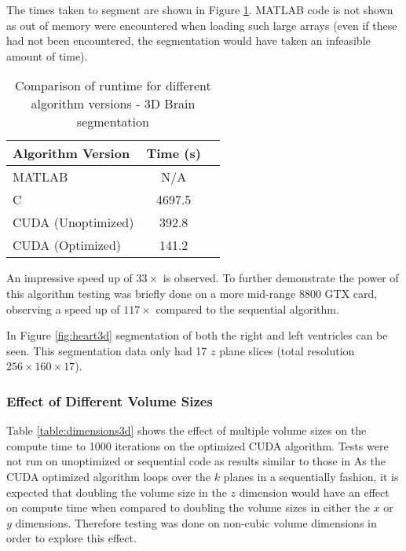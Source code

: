 The times taken to segment are shown in Figure \ref{brain3dtime}. MATLAB code is not shown as out of memory were encountered when loading such large arrays (even if these had not been encountered, the segmentation would have taken an infeasible amount of time).

\begin{table}[h]
\centering
\begin{tabular}{ | l | c | r | }
	\hline
	Algorithm Version  & Time (s)\\ \hline
  MATLAB 						 & N/A \\
  C 								 & 4697.5 \\
  CUDA (Unoptimized) & 392.8 \\
  CUDA (Optimized)   & 141.2  \\
  \hline
\end{tabular}\caption{Comparison of runtime for different algorithm versions - 3D Brain segmentation}
\label{brain3dtime}
\end{table}

An impressive speed up of $33 \times$ is observed. To further demonstrate the power of this algorithm testing was briefly done on a more mid-range 8800 GTX card, observing a speed up of $117 \times$ compared to the sequential algorithm.

In Figure \ref{fig:heart3d} segmentation of both the right and left ventricles can be seen. This segmentation data only had 17 $z$ plane slices (total resolution $256 \times 160 \times 17$).


\subsubsection{Effect of Different Volume Sizes}\label{dimensions3d}


Table \ref{table:dimensions3d} shows the effect of multiple volume sizes on the compute time to 1000 iterations on the optimized CUDA algorithm. Tests were not run on unoptimized or sequential code as results similar to those in 
As the CUDA optimized algorithm loops over the $k$ planes in a sequentially fashion, it is expected that doubling the volume size in the $z$ dimension would have an effect on compute time when compared to doubling the volume sizes in either the $x$ or $y$ dimensions. Therefore testing was done on non-cubic volume dimensions in order to explore this effect.

